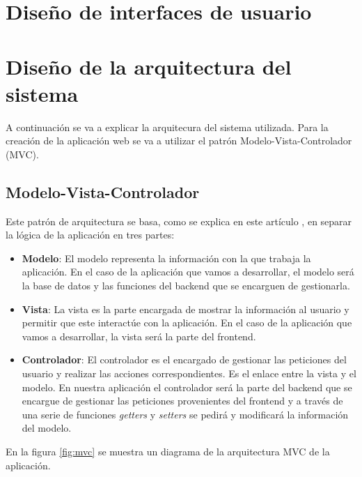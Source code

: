 \section{Diseño de interfaces de usuario}

\section{Diseño de la arquitectura del sistema}
A continuación se va a explicar la arquitecura del sistema utilizada.
Para la creación de la aplicación web se va a utilizar el patrón
Modelo-Vista-Controlador (MVC).

\subsection{Modelo-Vista-Controlador}
Este patrón de arquitectura se basa, como se explica en este artículo \cite{mvc},
en separar la lógica de la aplicación en tres partes:

\begin{itemize}
    \item \textbf{Modelo}: El modelo representa la información con la que trabaja
    la aplicación. En el caso de la aplicación que vamos a desarrollar, el modelo
    será la base de datos y las funciones del backend que se encarguen de gestionarla.
    \item \textbf{Vista}: La vista es la parte encargada de mostrar la información
    al usuario y permitir que este interactúe con la aplicación. En el caso de la
    aplicación que vamos a desarrollar, la vista será la parte del frontend.
    \item \textbf{Controlador}: El controlador es el encargado de gestionar las
    peticiones del usuario y realizar las acciones correspondientes. Es el enlace
    entre la vista y el modelo. En nuestra aplicación el controlador será la parte
    del backend que se encargue de gestionar las peticiones provenientes del frontend
    y a través de una serie de funciones \textit{getters} y \textit{setters} se
    pedirá y modificará la información del modelo.
\end{itemize}

En la figura \ref{fig:mvc} se muestra un diagrama de la arquitectura MVC de la
aplicación.

